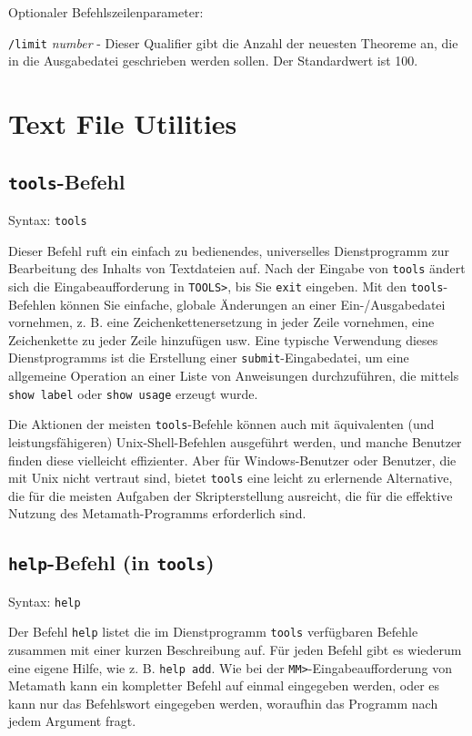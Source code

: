 Optionaler Befehlszeilenparameter:

    \texttt{/limit} {\em number} - Dieser Qualifier gibt die Anzahl der neuesten Theoreme an, die in die Ausgabedatei geschrieben werden sollen.  Der Standardwert ist 100.


\section{Text File Utilities}

\subsection{\texttt{tools}-Befehl}

Syntax:  \texttt{tools}

Dieser Befehl ruft ein einfach zu bedienendes, universelles Dienstprogramm zur Bearbeitung des Inhalts von Textdateien auf.  Nach der Eingabe von \texttt{tools} ändert sich die Eingabeaufforderung in \texttt{TOOLS>}, bis Sie \texttt{exit} eingeben.  Mit den \texttt{tools}-Befehlen können Sie einfache, globale Änderungen an einer Ein-/Ausgabedatei vornehmen, z. B. eine Zeichenkettenersetzung in jeder Zeile vornehmen, eine Zeichenkette zu jeder Zeile hinzufügen usw.  Eine typische Verwendung dieses Dienstprogramms ist die Erstellung einer \texttt{submit}-Eingabedatei, um eine allgemeine Operation an einer Liste von Anweisungen durchzuführen, die mittels \texttt{show label} oder \texttt{show usage} erzeugt wurde.

Die Aktionen der meisten \texttt{tools}-Befehle können auch mit äquivalenten (und leistungsfähigeren) Unix-Shell-Befehlen ausgeführt werden, und manche Benutzer finden diese vielleicht effizienter.  Aber für Windows-Benutzer oder Benutzer, die mit Unix nicht vertraut sind, bietet \texttt{tools} eine leicht zu erlernende Alternative, die für die meisten Aufgaben der Skripterstellung ausreicht, die für die effektive Nutzung des Metamath-Programms erforderlich sind.


\subsection{\texttt{help}-Befehl (in \texttt{tools})}

Syntax:  \texttt{help}

Der Befehl \texttt{help} listet die im Dienstprogramm \texttt{tools} verfügbaren Befehle zusammen mit einer kurzen Beschreibung auf.  Für jeden Befehl gibt es wiederum eine eigene Hilfe, wie z. B. \texttt{help add}.  Wie bei der \texttt{MM>}-Eingabeaufforderung von Metamath kann ein kompletter Befehl auf einmal eingegeben werden, oder es kann nur das Befehlswort eingegeben werden, woraufhin das Programm nach jedem Argument fragt.

